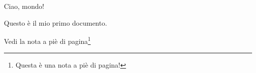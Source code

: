 \documentclass{article} %
\begin{document}
Ciao, mondo!

Questo è il mio primo documento.

Vedi la nota a piè di pagina\footnote[1]{Questa è una nota a piè di pagina!}
\end{document}
